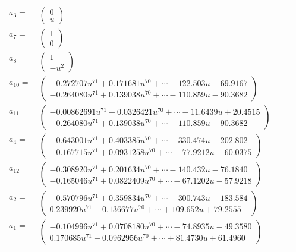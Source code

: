 \documentclass[1p]{elsarticle_modified}
\theoremstyle{definition}
\begin{document}
\begin{tabular}{m{7pt} m{180pt} m{7pt} m{180pt} }
\flushright $a_{3}=$&$\begin{pmatrix}0\\u\end{pmatrix}$ \\
\flushright $a_{7}=$&$\begin{pmatrix}1\\0\end{pmatrix}$ \\
\flushright $a_{8}=$&$\begin{pmatrix}1\\- u^2\end{pmatrix}$ \\
\flushright $a_{10}=$&$\begin{pmatrix}-0.272707 u^{71}+0.171681 u^{70}+\cdots-122.503 u-69.9167\\-0.264080 u^{71}+0.139038 u^{70}+\cdots-110.859 u-90.3682\end{pmatrix}$ \\
\flushright $a_{11}=$&$\begin{pmatrix}-0.00862691 u^{71}+0.0326421 u^{70}+\cdots-11.6439 u+20.4515\\-0.264080 u^{71}+0.139038 u^{70}+\cdots-110.859 u-90.3682\end{pmatrix}$ \\
\flushright $a_{4}=$&$\begin{pmatrix}-0.643001 u^{71}+0.403385 u^{70}+\cdots-330.474 u-202.802\\-0.167715 u^{71}+0.0931258 u^{70}+\cdots-77.9212 u-60.0375\end{pmatrix}$ \\
\flushright $a_{12}=$&$\begin{pmatrix}-0.308920 u^{71}+0.201634 u^{70}+\cdots-140.432 u-76.1840\\-0.165046 u^{71}+0.0822409 u^{70}+\cdots-67.1202 u-57.9218\end{pmatrix}$ \\
\flushright $a_{2}=$&$\begin{pmatrix}-0.570796 u^{71}+0.359834 u^{70}+\cdots-300.743 u-183.584\\0.239920 u^{71}-0.136677 u^{70}+\cdots+109.652 u+79.2555\end{pmatrix}$ \\
\flushright $a_{1}=$&$\begin{pmatrix}-0.104996 u^{71}+0.0708180 u^{70}+\cdots-74.8935 u-49.3580\\0.170685 u^{71}-0.0962956 u^{70}+\cdots+81.4730 u+61.4960\end{pmatrix}$ \\

\end{tabular}
\end{document}
